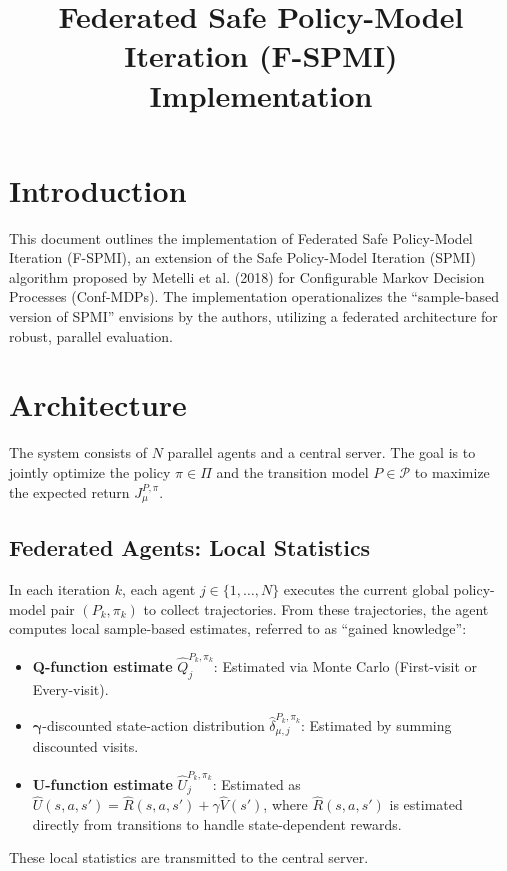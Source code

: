 \documentclass{article}
\title{Federated Safe Policy-Model Iteration (F-SPMI) Implementation}
\author{}
\date{}
\begin{document}
\maketitle

\section{Introduction}
This document outlines the implementation of Federated Safe Policy-Model Iteration (F-SPMI), an extension of the Safe Policy-Model Iteration (SPMI) algorithm proposed by Metelli et al. (2018) for Configurable Markov Decision Processes (Conf-MDPs). The implementation operationalizes the ``sample-based version of SPMI'' envisions by the authors, utilizing a federated architecture for robust, parallel evaluation.

\section{Architecture}
The system consists of $N$ parallel agents and a central server. The goal is to jointly optimize the policy $\pi \in \Pi$ and the transition model $P \in \mathcal{P}$ to maximize the expected return $J_\mu^{P, \pi}$.

\subsection{Federated Agents: Local Statistics}
In each iteration $k$, each agent $j \in \{1, \dots, N\}$ executes the current global policy-model pair $(P_k, \pi_k)$ to collect trajectories. From these trajectories, the agent computes local sample-based estimates, referred to as ``gained knowledge'':

\begin{itemize}
    \item \textbf{Q-function estimate} $\hat{Q}_j^{P_k, \pi_k}$: Estimated via Monte Carlo (First-visit or Every-visit).
    \item $\mathbf{\gamma}$-discounted state-action distribution $\hat{\delta}_{\mu,j}^{P_k, \pi_k}$: Estimated by summing discounted visits.
    \item \textbf{U-function estimate} $\hat{U}_j^{P_k, \pi_k}$: Estimated as $\hat{U}(s,a,s') = \hat{R}(s,a,s') + \gamma \hat{V}(s')$, where $\hat{R}(s,a,s')$ is estimated directly from transitions to handle state-dependent rewards.
\end{itemize}

These local statistics are transmitted to the central server.
\end{document}
